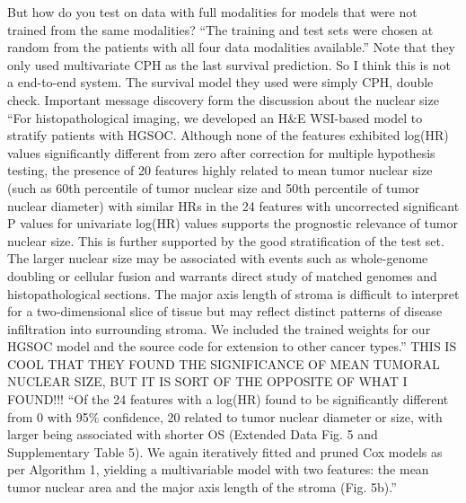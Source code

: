 \documentclass{article}%
\begin{document}
\newline%
\newline%
%
But how do you test on data with full modalities for models that were not trained from the same modalities? “The training and test sets were chosen at random from the patients with all four data modalities available.”%
\newline%
\newline%
%
Note that they only used multivariate CPH as the last survival prediction. So I think this is not a end{-}to{-}end system. %
\newline%
\newline%
%
The survival model they used were simply CPH, double check. %
\newline%
\newline%
%
Important message discovery form the discussion about the nuclear size “For histopathological imaging, we developed an H\&E WSI{-}based model to stratify patients with HGSOC. Although none of the features exhibited log(HR) values significantly different from zero after correction for multiple hypothesis testing, the presence of 20 features highly related to mean tumor nuclear size (such as 60th percentile of tumor nuclear size and 50th percentile of tumor nuclear diameter) with similar HRs in the 24 features with uncorrected significant P values for univariate log(HR) values supports the prognostic relevance of tumor nuclear size. This is further supported by the good stratification of the test set. The larger nuclear size may be associated with events such as whole{-}genome doubling or cellular fusion and warrants direct study of matched genomes and histopathological sections. The major axis length of stroma is difficult to interpret for a two{-}dimensional slice of tissue but may reflect distinct patterns of disease infiltration into surrounding stroma. We included the trained weights for our HGSOC model and the source code for extension to other cancer types.”%
\newline%
\newline%
%
THIS IS COOL THAT THEY FOUND THE SIGNIFICANCE OF MEAN TUMORAL NUCLEAR SIZE, BUT IT IS SORT OF THE OPPOSITE OF WHAT I FOUND!!! %
\newline%
\newline%
%
“Of the 24 features with a log(HR) found to be significantly different from 0 with 95\% confidence, 20 related to tumor nuclear diameter or size, with larger being associated with shorter OS (Extended Data Fig. 5 and Supplementary Table 5). We again iteratively fitted and pruned Cox models as per Algorithm 1, yielding a multivariable model with two features: the mean tumor nuclear area and the major axis length of the stroma (Fig. 5b).”%
\end{document}
